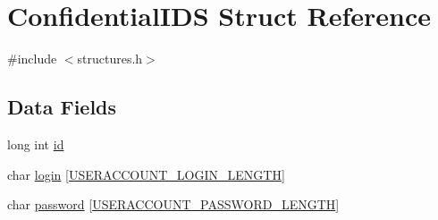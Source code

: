 \hypertarget{struct_confidential_i_d_s}{\section{Confidential\-I\-D\-S Struct Reference}
\label{struct_confidential_i_d_s}
}


{\ttfamily \#include $<$structures.\-h$>$}

\subsection*{Data Fields}
\begin{DoxyCompactItemize}
\item 
long int \hyperlink{struct_confidential_i_d_s_a53f4656a3ccbae3d40e94f582eef745f}{id}
\item 
char \hyperlink{struct_confidential_i_d_s_a4bf7e90f51b7f7d3617117ae6f12c052}{login} \mbox{[}\hyperlink{defines_8h_ae31be58dfd3ef1f3cb849fb35b7ac9ec}{U\-S\-E\-R\-A\-C\-C\-O\-U\-N\-T\-\_\-\-L\-O\-G\-I\-N\-\_\-\-L\-E\-N\-G\-T\-H}\mbox{]}
\item 
char \hyperlink{struct_confidential_i_d_s_a79861f2b044c93f50ef5ffe118c1e28d}{password} \mbox{[}\hyperlink{defines_8h_aff14d22469bb0bb5d650a58db2130a41}{U\-S\-E\-R\-A\-C\-C\-O\-U\-N\-T\-\_\-\-P\-A\-S\-S\-W\-O\-R\-D\-\_\-\-L\-E\-N\-G\-T\-H}\mbox{]}
\end{DoxyCompactItemize}


